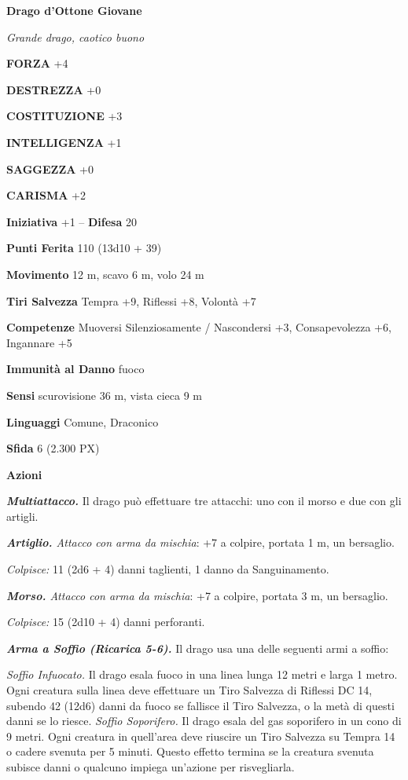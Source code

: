 \begin{multicols}{2}
	\medskip{}\textbf{Drago d'Ottone Giovane}

	\textit{Grande drago, caotico buono}

	\textbf{FORZA} +4

	\textbf{DESTREZZA} +0

	\textbf{COSTITUZIONE} +3

	\textbf{INTELLIGENZA} +1

	\textbf{SAGGEZZA} +0

	\textbf{CARISMA} +2

	\textbf{Iniziativa} +1 -- \textbf{Difesa} 20

	\textbf{Punti Ferita} 110 (13d10 + 39)

	\textbf{Movimento} 12 m, scavo 6 m, volo 24 m

	\textbf{Tiri Salvezza} Tempra +9, Riflessi +8, Volontà +7

	\textbf{Competenze} Muoversi Silenziosamente / Nascondersi +3, Consapevolezza +6, Ingannare +5

	\textbf{Immunità al Danno} fuoco

	\textbf{Sensi} scurovisione 36 m, vista cieca 9 m

	\textbf{Linguaggi} Comune, Draconico

	\textbf{Sfida} 6 (2.300 PX)

	\textbf{Azioni}

	\textit{\textbf{Multiattacco.}} Il drago può effettuare tre attacchi: uno con il morso e due con gli artigli.

	\textit{\textbf{Artiglio.} Attacco con arma da mischia}: +7 a colpire, portata 1 m, un bersaglio.

	\textit{Colpisce:} 11 (2d6 + 4) danni taglienti, 1 danno da Sanguinamento.

	\textit{\textbf{Morso.} Attacco con arma da mischia}: +7 a colpire, portata 3 m, un bersaglio.

	\textit{Colpisce:} 15 (2d10 + 4) danni perforanti.

	\textit{\textbf{Arma a Soffio (Ricarica 5-6).}} Il drago usa una delle seguenti armi a soffio:

	\textit{Soffio Infuocato.} Il drago esala fuoco in una linea lunga 12 metri e larga 1 metro. Ogni creatura sulla linea deve effettuare un Tiro Salvezza di Riflessi DC 14, subendo 42 (12d6) danni da fuoco se fallisce il Tiro Salvezza, o la metà di questi danni se lo riesce. \textit{Soffio Soporifero.} Il drago esala del gas soporifero in un cono di 9 metri. Ogni creatura in quell'area deve riuscire un Tiro Salvezza su Tempra 14 o cadere svenuta per 5 minuti. Questo effetto termina se la creatura svenuta subisce danni o qualcuno impiega un'azione per risvegliarla.


\end{multicols}
